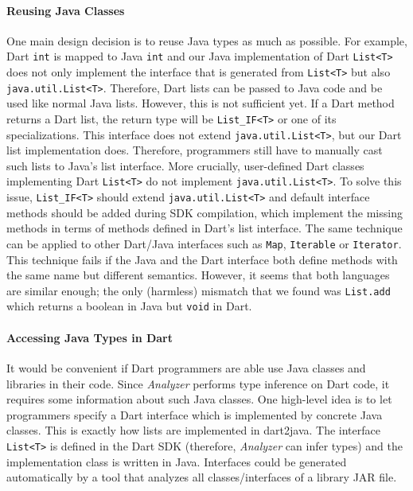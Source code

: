\documentclass[sigplan,9pt]{acmart}
\begin{document}
\paragraph{Reusing Java Classes}
One main design decision is to reuse Java types as much as possible. For example, Dart \texttt{int} is mapped to Java \texttt{int} and our Java implementation of Dart \texttt{List<T>} does not only implement the interface that is generated from \texttt{List<T>} but also \texttt{java.util.List<T>}. Therefore, Dart lists can be passed to Java code and be used like normal Java lists. However, this is not sufficient yet. If a Dart method returns a Dart list, the return type will be \texttt{List\_IF<T>} or one of its specializations. This interface does not extend \texttt{java.util.List<T>}, but our Dart list implementation does. Therefore, programmers still have to manually cast such lists to Java's list interface. More crucially, user-defined Dart classes implementing Dart \texttt{List<T>} do not implement \texttt{java.util.List<T>}. To solve this issue, \texttt{List\_IF<T>} should extend \texttt{java.util.List<T>} and default interface methods should be added during SDK compilation, which implement the missing methods in terms of methods defined in Dart's list interface. The same technique can be applied to other Dart/Java interfaces such as \texttt{Map}, \texttt{Iterable} or \texttt{Iterator}. This technique fails if the Java and the Dart interface both define methods with the same name but different semantics. However, it seems that both languages are similar enough; the only (harmless) mismatch that we found was \texttt{List.add} which returns a boolean in Java but \texttt{void} in Dart.

\paragraph{Accessing Java Types in Dart}
It would be convenient if Dart programmers are able use Java classes and libraries in their code. Since \emph{Analyzer} performs type inference on Dart code, it requires some information about such Java classes. One high-level idea is to let programmers specify a Dart interface which is implemented by concrete Java classes. This is exactly how lists are implemented in dart2java. The interface \texttt{List<T>} is defined in the Dart SDK (therefore, \emph{Analyzer} can infer types) and the implementation class is written in Java. Interfaces could be generated automatically by a tool that analyzes all classes/interfaces of a library JAR file.
\end{document}
